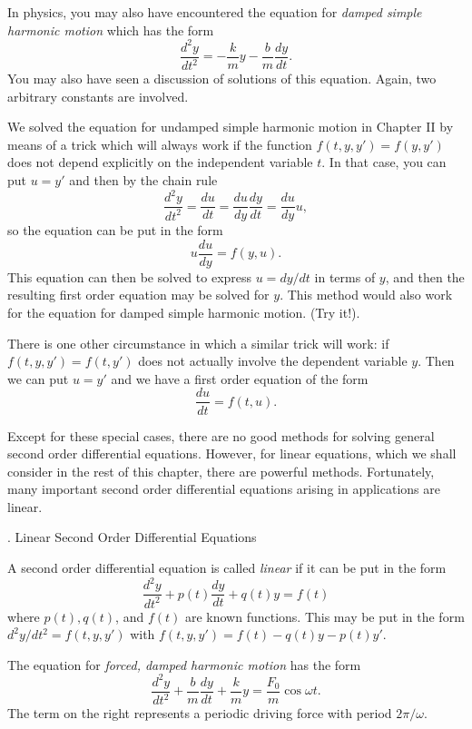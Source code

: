 In physics, you may also have encountered the equation for
{\it damped simple harmonic motion\/} which has the form
%
%
$$
\frac{d^2y}{dt^2} = -\frac km y - \frac bm \frac{dy}{dt}.
$$
You may also have seen a discussion of solutions of this
equation.  Again, two arbitrary constants are involved.
\endexample

We solved the equation for undamped simple harmonic motion
in 
Chapter II by means of a trick which will always work if
the function $f(t,y,y') = f(y,y')$ does not depend explicitly
on the independent variable $t$.  In that case, you can put $u = y'$
and then by the chain rule
$$
\frac{d^2y}{dt^2} = \frac{du}{dt} = \frac{du}{dy}\frac{dy}{dt}
   = \frac{du}{dy} u,
$$
so the equation can be put in the form
$$
  u\frac{du}{dy} = f(y,u).
$$
This equation can then be solved to express $u = dy/dt$
in terms of $y$, and then the resulting first order equation
may be solved for $y$.  This method would also work for the
equation for damped simple harmonic motion.  (Try it!).

There is one other circumstance in which a similar trick
will work: if $f(t,y,y') = f(t,y')$ does not actually
involve the dependent variable $y$.  Then we can put $u = y'$
and we have a first order equation of the form
$$
\frac{du}{dt} = f(t,u).
$$

Except for these special cases, there are no good methods for
solving general second order differential equations.  However,
for linear equations, which we shall consider in the rest
of this chapter, there are powerful methods.  Fortunately,
many important second order differential equations arising
in applications are linear.
\bigskip

\bigskip

\head \sn. Linear Second Order Differential Equations \endhead

A second order differential equation is called {\it linear\/} if
%
it can be put in the form
$$
\frac{d^2y}{dt^2} + p(t)\frac{dy}{dt} + q(t) y = f(t)
$$
where $p(t), q(t)$, and $f(t)$ are known functions.
This may be put in the form $d^2y/dt^2 = f(t,y,y')$
with $f(t,y,y') = f(t) - q(t)y - p(t)y'$.

\nextex
{}
  The equation for {\it forced,
damped harmonic motion\/} has the form
$$
\frac{d^2y}{dt^2} + \frac bm\frac{dy}{dt} + \frac km y = \frac{F_0}m 
\cos \omega t.
$$
The term on the right represents a periodic driving force with
period $2\pi/\omega$.
\endexample

